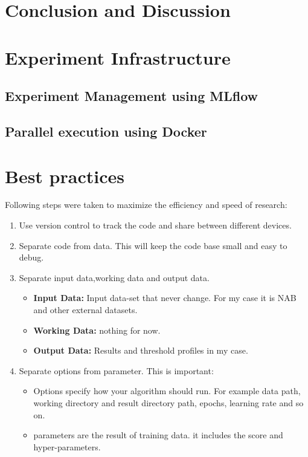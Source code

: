 \documentclass[12pt]{article}
\begin{document}
\newpage
\section{Conclusion and Discussion}
\newpage
\section{Experiment Infrastructure}
\newpage
\subsection{Experiment Management using MLflow}
\newpage
\subsection{Parallel execution using Docker}
\newpage
\section{Best practices}
Following steps were taken to maximize the efficiency and speed of research:
\begin{enumerate}
	\item Use version control to track the code and share between different devices.
	\item Separate code from data. This will keep the code base small and easy to debug.
	\item Separate input data,working data and output data.
	\begin{itemize}
		\item \textbf{Input Data:} Input data-set that never change. For my case it is NAB and other external datasets.
		\item \textbf{Working Data:} nothing for now.
		\item \textbf{Output Data:} Results and threshold profiles in my case. 
	\end{itemize}
	\item Separate options from parameter. This is important:
 	\begin{itemize}
 		\item Options specify how your algorithm should run. For example data path, working directory and result directory path, epochs, learning rate and so on.
 		\item parameters are the result of training data. it includes the score and hyper-parameters. 
 	\end{itemize}
	
\end{enumerate}
\newpage
\end{document}
